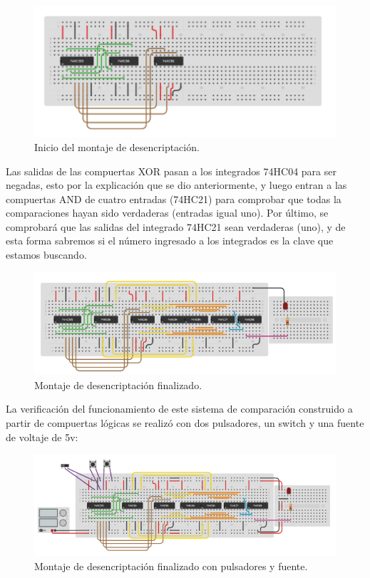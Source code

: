 \documentclass{article}
\begin{document}
\begin{figure}[h]
\includegraphics[scale=0.7]{desencriptacion1.png}
\centering
\caption{Inicio del montaje de desencriptación.}
\label{fig:desencriptación1}
\end{figure}

\newpage
Las salidas de las compuertas XOR pasan a los integrados 74HC04 para ser negadas, esto por la explicación que se dio anteriormente, y luego entran a las compuertas AND de cuatro entradas (74HC21) para comprobar que todas la comparaciones hayan sido verdaderas (entradas igual uno). Por último, se comprobará que las salidas del integrado 74HC21 sean verdaderas (uno), y de esta forma sabremos si el número ingresado a los integrados es la clave que estamos buscando.


\begin{figure}[h]
\includegraphics[scale=0.7]{desencriptacion2.png}
\centering
\caption{Montaje de desencriptación finalizado.}
\label{fig:desencriptación2}
\end{figure}

La verificación del funcionamiento de este sistema de comparación construido a partir de compuertas lógicas se realizó con dos pulsadores, un switch y una fuente de voltaje de 5v:

\newpage
\begin{figure}[h]
\includegraphics[scale=0.7]{desencriptacion pulsadores.png}
\centering
\caption{Montaje de desencriptación finalizado con pulsadores y fuente.}
\label{fig:desencriptación3}
\end{figure}
\end{document}

